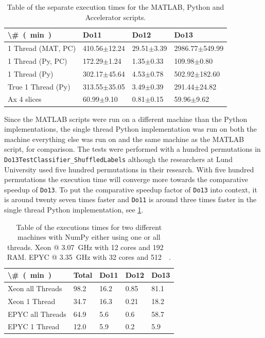 \documentclass[12pt, a4paper]{article}
\begin{document}
\begin{table}[H]
\centering
    \caption{Table of the separate execution times for the MATLAB, Python and Accelerator scripts.}
    \begin{tabular}{|l|l|l|l|}
    \hline
    \SI[parse-numbers=false]{\#}{(\minute)}    & Do11             & Do12           & Do13               \\ \hline
    1 Thread (MAT, PC) & 410.56$\pm$12.24 & 29.51$\pm$3.39 & 2986.77$\pm$549.99 \\ 
    1 Thread (Py, PC)  & 172.29$\pm$1.24  & 1.35$\pm$0.33  & 109.98$\pm$0.80    \\ 
    1 Thread (Py)      & 302.17$\pm$45.64 & 4.53$\pm$0.78  & 502.92$\pm$182.60  \\ 
    True 1 Thread (Py) & 313.55$\pm$35.05 & 3.49$\pm$0.39  & 291.44$\pm$24.82   \\ 
    Ax 4 slices        & 60.99$\pm$9.10   & 0.81$\pm$0.15  & 59.96$\pm$9.62     \\ \hline
    \end{tabular}
    \label{AppendixSeperateTimes}
\end{table}


Since the MATLAB scripts were run on a different machine than the Python implementations, the single thread Python implementation was run on both the machine everything else was run on and the same machine as the MATLAB script, for comparison.
The tests were performed with a hundred permutations in \texttt{Do13TestClassifier\_ShuffledLabels} although the researchers at Lund University used five hundred permutations in their research.
With five hundred permutations the execution time will converge more towards the comparative speedup of \texttt{Do13}.
To put the comparative speedup factor of \texttt{Do13} into context, it is around twenty seven times faster and \texttt{Do11} is around three times faster in the single thread Python implementation, see \cref{AppendixSeperateTimes}.


\begin{table}[H]
\centering
    \caption{Table of the executions times for two different machines with NumPy either using one or all threads.
    Xeon @ \SI{3.07}{\giga\hertz} with 12 cores and \SI{192}{\giga\byte} RAM. EPYC @ \SI{3.35}{\giga\hertz} with 32 cores and \SI{512}{\giga\byte}.}
    \begin{tabular}{|l|l|l|l|l|}
    \hline
    \SI[parse-numbers=false]{\#}{(\minute)} & Total & Do11  & Do12  & Do13  \\ \hline
    Xeon all Threads                        & 98.2  & 16.2  & 0.85  & 81.1  \\ 
    Xeon 1 Thread                           & 34.7  & 16.3  & 0.21  & 18.2  \\ 
    EPYC all Threads                        & 64.9  & 5.6   & 0.6   & 58.7  \\ 
    EPYC 1 Thread                           & 12.0  & 5.9   & 0.2   & 5.9   \\ \hline
    \end{tabular}
    \label{Acc:NumPy1Thread}
\end{table}
\end{document}

